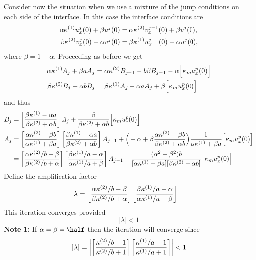 \documentclass[11pt]{article}
\begin{document}
Consider now the situation when we use a mixture of the jump conditions on each side of the interface.
In this case the interface conditions are
\begin{align*}
  \alpha \kappa^{(1)} u^j_x(0) + \beta u^{j}(0) &= \alpha \kappa^{(2)} v^{j-1}_x(0) + \beta v^j(0), \\
  \beta \kappa^{(2)} v^j_x(0) -\alpha v^{j}(0) &= \beta  \kappa^{(1)} u^{j-1}_x(0) -\alpha u^j(0), 
\end{align*}
where $\beta=1-\alpha$. Proceeding as before we get 
\begin{align*}
   \alpha \kappa^{(1)} A_j + \beta a A_j &= \alpha \kappa^{(2)} B_{j-1} - b \beta B_{j-1} 
                   - \alpha \Big[\kappa_mu^p_x(0)\Big] \\
   \beta \kappa^{(2)} B_j + \alpha b B_j &= \beta \kappa^{(1)} A_j -\alpha a A_j +\beta \Big[\kappa_mu^p_x(0)\Big]
\end{align*}
and thus
\begin{align*}
   B_j &= \left[ {\beta\kappa^{(1)} -\alpha a\over \beta\kappa^{(2)}+\alpha b } \right] A_j + 
                        {\beta\over \beta\kappa^{(2)}+\alpha b } \Big[\kappa_mu^p_x(0)\Big] \\
   A_j &= \left[ {\alpha\kappa^{(2)} -\beta b \over \alpha\kappa^{(1)}+\beta a } \right]
          \left[ {\beta\kappa^{(1)} -\alpha a  \over \beta\kappa^{(2)}+\alpha b} \right] A_{j-1}  
                   + \Big(  - \alpha  + \beta {\alpha\kappa^{(2)}-\beta b \over \beta\kappa^{(2)}+\alpha b}\Big)
                    {1\over \alpha\kappa^{(1)}+\beta a} \Big[\kappa_mu^p_x(0)\Big] \\
       &= \left[ {\alpha\kappa^{(2)}/b -\beta \over \beta\kappa^{(2)}/b+\alpha}\right]
             \left[ {\beta\kappa^{(1)}/a -\alpha  \over \alpha\kappa^{(1)}/a+\beta }\right]A_{j-1} 
          - { (\alpha^2 + \beta^2) b \over [\alpha\kappa^{(1)}+\beta a][\beta\kappa^{(2)}+\alpha b] }\Big[\kappa_mu^p_x(0)\Big]
\end{align*}
Define the amplification factor
\begin{align*}
  \lambda &= \left[ {\alpha\kappa^{(2)}/b -\beta \over \beta\kappa^{(2)}/b+\alpha}\right]
             \left[ {\beta\kappa^{(1)}/a -\alpha  \over \alpha\kappa^{(1)}/a+\beta }\right]
\end{align*}
This iteration converges provided
\begin{equation}
   \left\vert \lambda \right\vert <1 
\end{equation}
{\bf Note 1:} If $\alpha=\beta=\half$ then the iteration will converge since
\begin{equation}
   \left\vert \lambda \right\vert = 
   \left\vert \left[ {\kappa^{(2)}/b -1 \over \kappa^{(2)}/b+1}\right]
              \left[ {\kappa^{(1)}/a - 1 \over \kappa^{(1)}/a+ 1 }\right]  \right\vert <1 
\end{equation}
\end{document}
